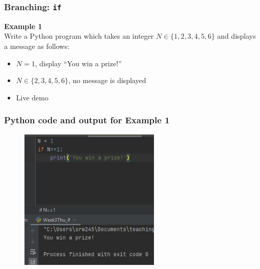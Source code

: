 \documentclass[english,14pt]{beamer}
\begin{document}
\begin{frame}[fragile]

\frametitle{}

\frametitle{Branching: \texttt{if}}

\textbf{Example 1}\\
\vspace*{5mm}
Write a Python program which takes an integer $N \in \{1,2,3,4,5,6\}$ and displays a message as follows:

\begin{itemize}
\item $N=1$, display ``You win a prize!''
\item $N \in \{2,3,4,5,6\}$, no message is displayed
\end{itemize}

\vspace*{5mm}

\begin{itemize}
	\item Live demo
\end{itemize}
	
\end{frame}


\begin{frame}[fragile]

\frametitle{Python code and output for Example 1}

\begin{figure}[ht]
	\centering
	\includegraphics[width=0.6\textwidth]{figures/Week3ThuEx1a}
\end{figure}

\end{frame}
\end{document}
